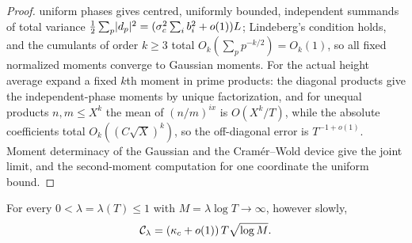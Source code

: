 \begin{proof}
uniform phases gives centred, uniformly bounded, independent summands of total variance
$\tfrac12\sum_p\lvert d_p\rvert^2=(\sigma_c^2\sum_ib_i^2+o(1))L$; Lindeberg's condition holds, and the cumulants of order
$k\ge3$ total $O_k(\sum_pp^{-k/2})=O_k(1)$, so all fixed normalized moments converge to Gaussian moments. For the
actual height average expand a fixed $k$th moment in prime products: the diagonal products give the
independent-phase moments by unique factorization, and for unequal products $n,m\le X^k$ the mean of $(n/m)^{ix}$
is $O(X^k/T)$, while the absolute coefficients total $O_k((C\sqrt X)^k)$, so the off-diagonal error is
$T^{-1+o(1)}$. Moment determinacy of the Gaussian and the Cram\'er--Wold device give the joint limit, and the
second-moment computation for one coordinate the uniform bound.
\end{proof}

\begin{theorem}\label{chz:thm:deletion}
For every $0<\lambda=\lambda(T)\le1$ with $M=\lambda\log T\to\infty$, however slowly,
\[
 \mathcal{C}_\lambda=(\kappa_c+o(1))\,T\sqrt{\log M}.
\]
\end{theorem}

